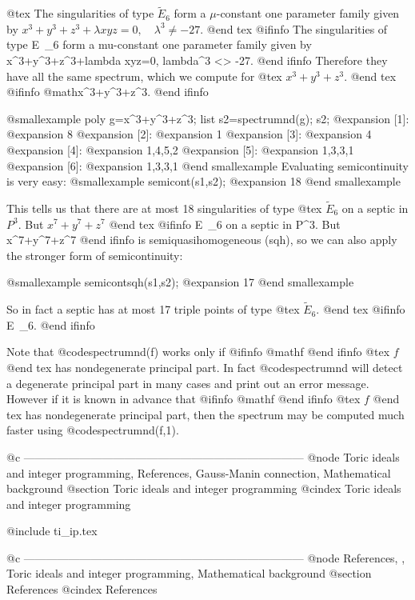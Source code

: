 @tex
The singularities of type $\tilde{E}_6$ form a
$\mu$-constant one parameter family given by
$x^3+y^3+z^3+\lambda xyz=0,\quad \lambda^3\neq-27$.
@end tex
@ifinfo
The singularities of type E~_6 form a
mu-constant one parameter family given by
x^3+y^3+z^3+lambda xyz=0, lambda^3 <> -27.
@end ifinfo
Therefore they have all the same spectrum, which we compute
for 
@tex
$x^3+y^3+z^3$.
@end tex
@ifinfo
@math{x^3+y^3+z^3}.
@end ifinfo

@smallexample
poly g=x^3+y^3+z^3;
list s2=spectrumnd(g);
s2;
@expansion{} [1]:
@expansion{}    8
@expansion{} [2]:
@expansion{}    1
@expansion{} [3]:
@expansion{}    4
@expansion{} [4]:
@expansion{}    1,4,5,2
@expansion{} [5]:
@expansion{}    1,3,3,1
@expansion{} [6]:
@expansion{}    1,3,3,1
@end smallexample
Evaluating semicontinuity is very easy:
@smallexample
semicont(s1,s2);
@expansion{} 18
@end smallexample

This tells us that there are at most 18 singularities of type
@tex
$\tilde{E}_6$ on a septic in $P^3$. But $x^7+y^7+z^7$
@end tex
@ifinfo
E~_6 on a septic in P^3. But x^7+y^7+z^7
@end ifinfo
is semiquasihomogeneous (sqh), so we can also apply the stronger
form of semicontinuity:

@smallexample
semicontsqh(s1,s2);
@expansion{} 17
@end smallexample

So in fact a septic has at most 17 triple points of type
@tex
$\tilde{E}_6$.
@end tex
@ifinfo
E~_6.
@end ifinfo

Note that @code{spectrumnd(f)} works only if 
@ifinfo
@math{f}
@end ifinfo
@tex
$f$
@end tex
 has nondegenerate
principal part. In fact @code{spectrumnd} will detect a degenerate
principal part in many cases and print out an error message.
However if it is known in advance that 
@ifinfo
@math{f}
@end ifinfo
@tex
$f$
@end tex
 has nondegenerate
principal part, then the spectrum may be computed much faster
using @code{spectrumnd(f,1)}.

@c ---------------------------------------------------------------------------
@node Toric ideals and integer programming, References, Gauss-Manin connection, Mathematical background
@section Toric ideals and integer programming
@cindex Toric ideals and integer programming

@include ti_ip.tex

@c ---------------------------------------------------------------------------
@node References, , Toric ideals and integer programming, Mathematical background
@section References
@cindex References

